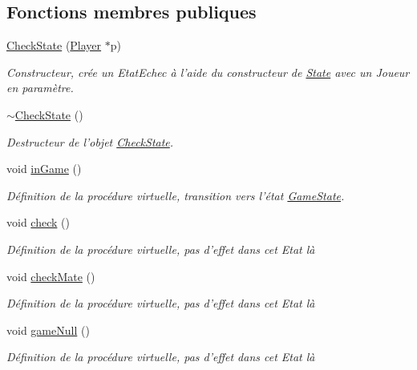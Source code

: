 \subsection*{Fonctions membres publiques}
\begin{DoxyCompactItemize}
\item 
\hyperlink{class_check_state_a5027a0f3dc626241c48ac33b0b974311}{Check\-State} (\hyperlink{class_player}{Player} $\ast$p)
\begin{DoxyCompactList}\small\item\em Constructeur, crée un Etat\-Echec à l'aide du constructeur de \hyperlink{class_state}{State} avec un Joueur en paramètre. \end{DoxyCompactList}\item 
\hyperlink{class_check_state_aecd4b3d189f47df10445e70aec28502b}{$\sim$\-Check\-State} ()
\begin{DoxyCompactList}\small\item\em Destructeur de l'objet \hyperlink{class_check_state}{Check\-State}. \end{DoxyCompactList}\item 
void \hyperlink{class_check_state_a3cc0cb64d061a72d91ee60b60801aa3b}{in\-Game} ()
\begin{DoxyCompactList}\small\item\em Définition de la procédure virtuelle, transition vers l'état \hyperlink{class_game_state}{Game\-State}. \end{DoxyCompactList}\item 
void \hyperlink{class_check_state_a7e365f95e322b61609f05202c28db278}{check} ()
\begin{DoxyCompactList}\small\item\em Définition de la procédure virtuelle, pas d'effet dans cet Etat là \end{DoxyCompactList}\item 
void \hyperlink{class_check_state_afb093377619bc04bcba50db601368019}{check\-Mate} ()
\begin{DoxyCompactList}\small\item\em Définition de la procédure virtuelle, pas d'effet dans cet Etat là \end{DoxyCompactList}\item 
void \hyperlink{class_check_state_ae3cc6446e2dd5de333797bb180104c50}{game\-Null} ()
\begin{DoxyCompactList}\small\item\em Définition de la procédure virtuelle, pas d'effet dans cet Etat là \end{DoxyCompactList}\item 

\end{DoxyCompactItemize}
